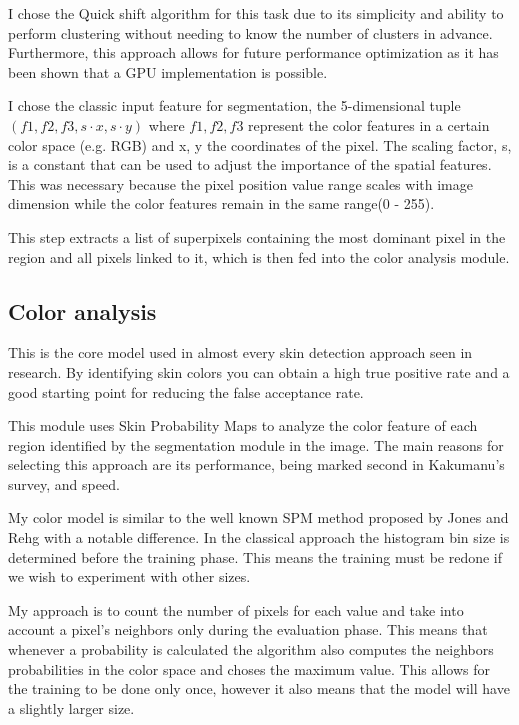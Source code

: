 \documentclass[12pt]{report}
\begin{document}
	I chose the  Quick shift algorithm for this task due to its simplicity and ability to perform clustering without needing to know the number of clusters in advance. Furthermore, this approach allows for future performance optimization as it has been shown that a GPU implementation is possible\cite{quickshift_gpu}.
	
	I chose the classic input feature for segmentation, the 5-dimensional tuple $(f1, f2, f3, s \cdot x, s \cdot y)$ where $f1, f2, f3$ represent the color features in a certain color space (e.g. RGB) and x, y the coordinates of the pixel. The scaling factor, s, is a constant that can be used to adjust the importance of the spatial features. This was necessary because the pixel position value range scales with image dimension while the color features remain in the same range(0 - 255).
	
	This step extracts a list of superpixels containing the most dominant pixel in the region and all pixels linked to it, which is then fed into the color analysis module.
	
	\subsection{Color analysis}
	This is the core model used in almost every skin detection approach seen in research. By identifying skin colors you can obtain a high true positive rate and a good starting point for reducing the false acceptance rate.
	
	This module uses Skin Probability Maps to analyze the color feature of each region identified by the segmentation module in the image. The main reasons for selecting this approach are its performance, being marked second in Kakumanu's survey\cite{survey_skin_color_modeling}, and speed.
	
	My color model is similar to the well known SPM method proposed by Jones and Rehg\cite{compaq} with a notable difference. In the classical approach the histogram bin size is determined before the training phase. This means the training must be redone if we wish to experiment with other sizes. 
	
	My approach is to count the number of pixels for each value and take into account a pixel's neighbors only during the evaluation phase. This means that whenever a probability is calculated the algorithm also computes the neighbors probabilities in the color space and choses the maximum value. This allows for the training to be done only once, however it also means that the model will have a slightly larger size. 
	
\end{document}
